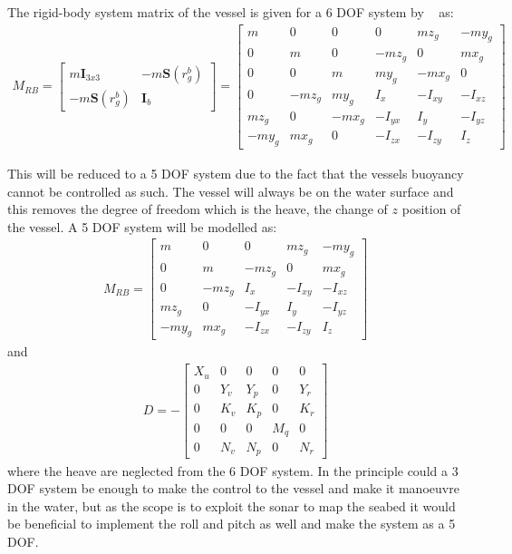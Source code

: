 The rigid-body system matrix of the vessel is given for a 6 \ac{DOF} system by ~\citep{fossen} as:
\begin{align}
M_{RB} =
\begin{bmatrix}
m\boldsymbol{I}_{3x3} & -m\boldsymbol{S}(r^b_g)\\
-m\boldsymbol{S}(r^b_g) & \boldsymbol{I}_b
\end{bmatrix}
=
\begin{bmatrix}
m & 0 & 0 & 0 & mz_g & -my_g\\
0 & m & 0 & -mz_g & 0 & mx_g\\
0 & 0 & m & my_g & -mx_g & 0\\
0 & -mz_g & my_g & I_x & -I_{xy} & -I_{xz}\\
mz_g & 0 & -mx_g & -I_{yx} & I_y & -I_{yz}\\
-my_g & mx_g & 0 & -I_{zx} & -I_{zy} & I_z
\end{bmatrix}
\end{align}

This will be reduced to a 5 \ac{DOF} system due to the fact that the vessels buoyancy cannot be controlled as such. The vessel will always be on the water surface and this removes the degree of freedom which is the heave, the change of $z$ position of the vessel. A 5 \ac{DOF} system will be modelled as:
\begin{align}
M_{RB} =
\begin{bmatrix}
m & 0 & 0 & mz_g & -my_g\\
0 & m & -mz_g & 0 & mx_g\\
0 & -mz_g & I_x & -I_{xy} & -I_{xz}\\
mz_g & 0 & -I_{yx} & I_y & -I_{yz}\\
-my_g & mx_g & -I_{zx} & -I_{zy} & I_z
\end{bmatrix}
\end{align}
and
\begin{align}
D = -
\begin{bmatrix}
X_u & 0 & 0 & 0 & 0\\
0 & Y_v & Y_p & 0 & Y_r\\
0 & K_v & K_p & 0 & K_r\\
0 & 0 & 0 & M_q & 0\\
0 & N_v & N_p & 0 & N_r
\end{bmatrix}
\end{align}
where the heave are neglected from the 6 \ac{DOF} system. In the principle could a 3 \ac{DOF} system be enough to make the control to the vessel and make it manoeuvre in the water, but as the scope is to exploit the sonar to map the seabed it would be beneficial to implement the roll and pitch as well and make the system as a 5 \ac{DOF}.

